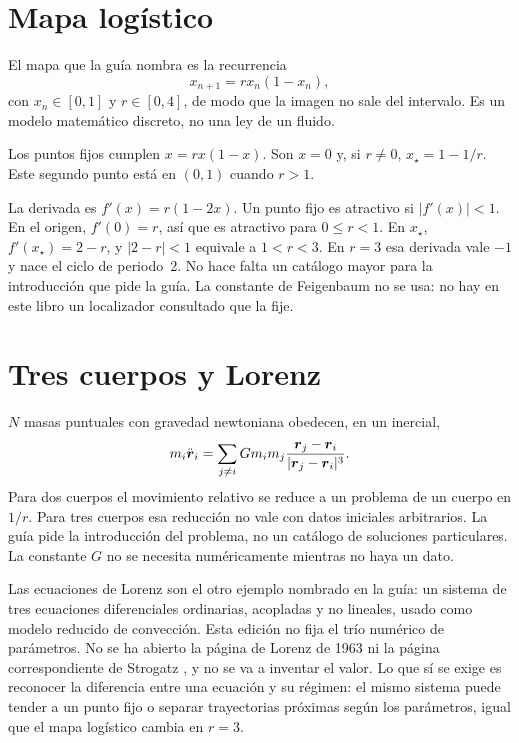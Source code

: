 \section{Mapa logístico}

El mapa que la guía nombra es la recurrencia
\begin{equation}
\label{eq:logistico}
x_{n+1}=r x_n(1-x_n),
\end{equation}
con \(x_n\in[0,1]\) y \(r\in[0,4]\), de modo que la imagen no sale del intervalo. Es un modelo matemático discreto, no una ley de un fluido.

Los puntos fijos cumplen \(x=rx(1-x)\). Son \(x=0\) y, si \(r\neq 0\), \(x_\star=1-1/r\). Este segundo punto está en \((0,1)\) cuando \(r>1\).

La derivada es \(f'(x)=r(1-2x)\). Un punto fijo es atractivo si \(|f'(x)|<1\). En el origen, \(f'(0)=r\), así que es atractivo para \(0\le r<1\). En \(x_\star\), \(f'(x_\star)=2-r\), y \(|2-r|<1\) equivale a \(1<r<3\). En \(r=3\) esa derivada vale \(-1\) y nace el ciclo de periodo~2. No hace falta un catálogo mayor para la introducción que pide la guía. La constante de Feigenbaum no se usa: no hay en este libro un localizador consultado que la fije.

\section{Tres cuerpos y Lorenz}

\(N\) masas puntuales con gravedad newtoniana obedecen, en un inercial,
\begin{equation}
\label{eq:n-cuerpos}
m_i\ddot{\boldsymbol{r}}_i
=\sum_{j\neq i} G m_i m_j\frac{\boldsymbol{r}_j-\boldsymbol{r}_i}{|\boldsymbol{r}_j-\boldsymbol{r}_i|^3}.
\end{equation}
Para dos cuerpos el movimiento relativo se reduce a un problema de un cuerpo en \(1/r\). Para tres cuerpos esa reducción no vale con datos iniciales arbitrarios. La guía pide la introducción del problema, no un catálogo de soluciones particulares. La constante \(G\) no se necesita numéricamente mientras no haya un dato.

Las ecuaciones de Lorenz son el otro ejemplo nombrado en la guía: un sistema de tres ecuaciones diferenciales ordinarias, acopladas y no lineales, usado como modelo reducido de convección. Esta edición no fija el trío numérico de parámetros. No se ha abierto la página de Lorenz de 1963 ni la página correspondiente de Strogatz \parencite{strogatz2018}, y no se va a inventar el valor. Lo que sí se exige es reconocer la diferencia entre una ecuación y su régimen: el mismo sistema puede tender a un punto fijo o separar trayectorias próximas según los parámetros, igual que el mapa logístico cambia en \(r=3\).

